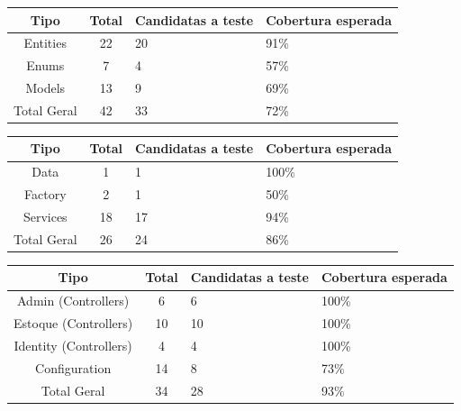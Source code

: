 \documentclass[
	12pt,				%
	openany,			%
	twoside,			%
	a4paper,			%
	english,			%
	brazil				%
	]{abntex2}
\begin{document}
\begin{quadro}[htb]
\centering
\caption{Resumo Consolidado Estoque.Domain}
\label{res_domain}
\begin{tabular}{|c|c|p{4cm}|p{4cm}|}
\hline
\textbf{Tipo} & \textbf{Total} & \textbf{Candidatas a teste} & \textbf{Cobertura esperada} \\
\hline
Entities & 22 & 20 & 91\% \\ \hline
Enums & 7 & 4 & 57\% \\ \hline
Models & 13 & 9 & 69\% \\ \hline
Total Geral & 42 & 33 & 72\% \\ \hline

\hline
\end{tabular}
\end{quadro}

\FloatBarrier

\begin{quadro}[htb]
\centering
\caption{Resumo Consolidado Estoque.Infrastructure}
\label{res_infrastructure}
\begin{tabular}{|c|c|p{4cm}|p{4cm}|}
\hline
\textbf{Tipo} & \textbf{Total} & \textbf{Candidatas a teste} & \textbf{Cobertura esperada} \\
\hline
Data & 1 & 1 & 100\% \\ \hline
Factory & 2 & 1 & 50\% \\ \hline
Services & 18 & 17 & 94\% \\ \hline
Total Geral & 26 & 24 & 86\% \\ \hline

\hline
\end{tabular}
\end{quadro}

\FloatBarrier

\begin{quadro}[htb]
\centering
\caption{Resumo Consolidado Estoque.Web}
\label{res_web}
\begin{tabular}{|c|c|p{4cm}|p{4cm}|}
\hline
\textbf{Tipo} & \textbf{Total} & \textbf{Candidatas a teste} & \textbf{Cobertura esperada} \\
\hline
Admin (Controllers) & 6 & 6 & 100\% \\ \hline
Estoque (Controllers) & 10 & 10 & 100\% \\ \hline
Identity (Controllers) & 4 & 4 & 100\% \\ \hline
Configuration & 14 & 8 & 73\% \\ \hline
Total Geral & 34 & 28 & 93\% \\ \hline

\hline
\end{tabular}
\end{quadro}
\end{document}
